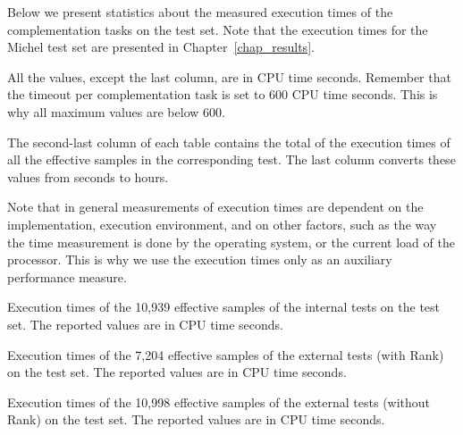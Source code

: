 Below we present statistics about the measured execution times of the complementation tasks on the \goal{} test set. Note that the execution times for the Michel test set are presented in Chapter~\ref{chap_results}.

All the values, except the last column, are in CPU time seconds. Remember that the timeout per complementation task is set to 600 CPU time seconds. This is why all maximum values are below 600.

The second-last column of each table contains the total of the execution times of all the effective samples in the corresponding test. The last column converts these values from seconds to hours.

Note that in general measurements of execution times are dependent on the implementation, execution environment, and on other factors, such as the way the time measurement is done by the operating system, or the current load of the processor. This is why we use the execution times only as an auxiliary performance measure.



\vskip0.5cm
\begin{table}[htb]
\centering

\caption{Execution times of the 10,939 effective samples of the internal tests on the \goal{} test set. The reported values are in CPU time seconds.} 
\end{table}
\vskip0.25cm
\begin{table}[htb]
\centering

\caption{Execution times of the 7,204 effective samples of the external tests (with Rank) on the \goal{} test set. The reported values are in CPU time seconds.}
\end{table}

\makeatletter
\setlength{\@fptop}{5pt}
\makeatother

\begin{table}[htb]
\centering

\caption{Execution times of the 10,998 effective samples of the external tests (without Rank) on the \goal{} test set. The reported values are in CPU time seconds.} 
\end{table}
